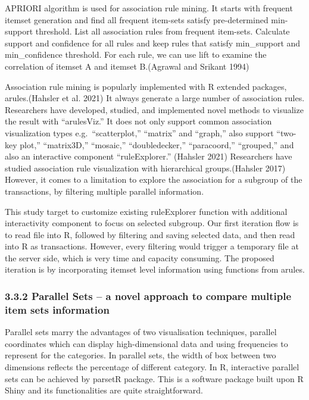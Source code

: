 \documentclass{acm_proc_article-sp}
\begin{document}
APRIORI algorithm is used for association rule mining. It starts with
frequent itemset generation and find all frequent item-sets satisfy
pre-determined min-support threshold. List all association rules from
frequent item-sets. Calculate support and confidence for all rules and
keep rules that satisfy min\_support and min\_confidence threshold. For
each rule, we can use lift to examine the correlation of itemset A and
itemset B.(Agrawal and Srikant 1994)

Association rule mining is popularly implemented with R extended
packages, arules.(Hahsler et al. 2021) It always generate a large number
of association rules. Researchers have developed, studied, and
implemented novel methods to visualize the result with ``arulesViz.'' It
does not only support common association visualization types
e.g.~``scatterplot,'' ``matrix'' and ``graph,'' also support ``two-key
plot,'' ``matrix3D,'' ``mosaic,'' ``doubledecker,'' ``paracoord,''
``grouped,'' and also an interactive component ``ruleExplorer.''
(Hahsler 2021) Researchers have studied association rule visualization
with hierarchical groups.(Hahsler 2017) However, it comes to a
limitation to explore the association for a subgroup of the
transactions, by filtering multiple parallel information.

This study target to customize existing ruleExplorer function with
additional interactivity component to focus on selected subgroup. Our
first iteration flow is to read file into R, followed by filtering and
saving selected data, and then read into R as transactions. However,
every filtering would trigger a temporary file at the server side, which
is very time and capacity consuming. The proposed iteration is by
incorporating itemset level information using functions from arules.

\hypertarget{parallel-sets-a-novel-approach-to-compare-multiple-item-sets-information}{%
\subsubsection{3.3.2 Parallel Sets -- a novel approach to compare
multiple item sets
information}\label{parallel-sets-a-novel-approach-to-compare-multiple-item-sets-information}}

Parallel sets marry the advantages of two visualisation techniques,
parallel coordinates which can display high-dimensional data and using
frequencies to represent for the categories. In parallel sets, the width
of box between two dimensions reflects the percentage of different
category. In R, interactive parallel sets can be achieved by parsetR
package. This is a software package built upon R Shiny and its
functionalities are quite straightforward.
\end{document}
